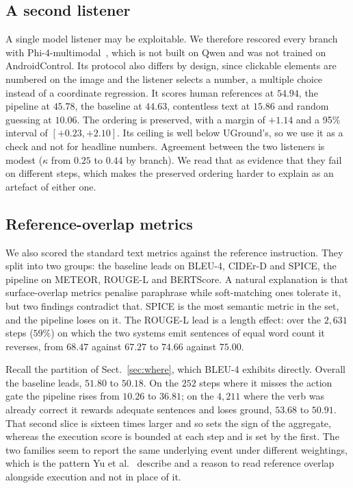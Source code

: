 \documentclass[runningheads,a4paper]{llncs}
\begin{document}
\subsection{A second listener}
A single model listener may be exploitable. We therefore rescored every branch with
Phi-4-multimodal~\cite{phi4}, which is not built on Qwen and was not trained on AndroidControl.
Its protocol also differs by design, since clickable elements are numbered on the image and the
listener selects a number, a multiple choice instead of a coordinate regression. It scores human
references at $54.94$, the pipeline at $45.78$, the baseline at $44.63$, contentless text at
$15.86$ and random guessing at $10.06$. The ordering is preserved, with a margin of $+1.14$ and a
95\% interval of $[+0.23,+2.10]$. Its ceiling is well below UGround's, so we use it as a check
and not for headline numbers. Agreement between the two listeners is modest ($\kappa$ from $0.25$ to
$0.44$ by branch). We read that as evidence that they fail on different steps, which makes the
preserved ordering harder to explain as an artefact of either one.

\subsection{Reference-overlap metrics}
We also scored the standard text metrics against the reference instruction. They split into two
groups: the baseline leads on BLEU-4, CIDEr-D and SPICE, the pipeline on METEOR, ROUGE-L and
BERTScore. A natural explanation is that surface-overlap metrics penalise
paraphrase while soft-matching ones tolerate it, but two findings contradict that. SPICE is the
most semantic metric in the set, and the pipeline loses on it. The ROUGE-L lead is a length
effect: over the $2{,}631$ steps ($59\%$) on which the two systems emit sentences of equal word
count it reverses, from $68.47$ against $67.27$ to $74.66$ against $75.00$.

Recall the partition of Sect.~\ref{sec:where}, which BLEU-4 exhibits directly.
Overall the baseline leads, $51.80$ to $50.18$. On the $252$ steps where it misses the action
gate the pipeline rises from $10.26$ to $36.81$; on the $4{,}211$ where the verb was
already correct it rewards adequate sentences and loses ground, $53.68$ to $50.91$. That second
slice is sixteen times larger and so sets the sign of the aggregate, whereas the execution score is bounded at each step
and is set by the first. The two families seem to report the same underlying event under different
weightings, which is the pattern Yu et al.~\cite{yu2016} describe and a reason to read reference
overlap alongside execution and not in place of it.
\end{document}
